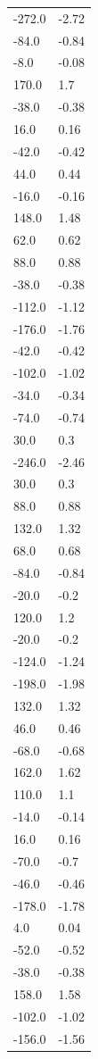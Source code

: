 \begin{longtable}{ll}
-272.0 & -2.72 \\
-84.0 & -0.84 \\
-8.0 & -0.08 \\
170.0 & 1.7 \\
-38.0 & -0.38 \\
16.0 & 0.16 \\
-42.0 & -0.42 \\
44.0 & 0.44 \\
-16.0 & -0.16 \\
148.0 & 1.48 \\
62.0 & 0.62 \\
88.0 & 0.88 \\
-38.0 & -0.38 \\
-112.0 & -1.12 \\
-176.0 & -1.76 \\
-42.0 & -0.42 \\
-102.0 & -1.02 \\
-34.0 & -0.34 \\
-74.0 & -0.74 \\
30.0 & 0.3 \\
-246.0 & -2.46 \\
30.0 & 0.3 \\
88.0 & 0.88 \\
132.0 & 1.32 \\
68.0 & 0.68 \\
-84.0 & -0.84 \\
-20.0 & -0.2 \\
120.0 & 1.2 \\
-20.0 & -0.2 \\
-124.0 & -1.24 \\
-198.0 & -1.98 \\
132.0 & 1.32 \\
46.0 & 0.46 \\
-68.0 & -0.68 \\
162.0 & 1.62 \\
110.0 & 1.1 \\
-14.0 & -0.14 \\
16.0 & 0.16 \\
-70.0 & -0.7 \\
-46.0 & -0.46 \\
-178.0 & -1.78 \\
4.0 & 0.04 \\
-52.0 & -0.52 \\
-38.0 & -0.38 \\
158.0 & 1.58 \\
-102.0 & -1.02 \\
-156.0 & -1.56 \\

\end{longtable}

